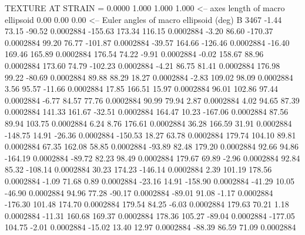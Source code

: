TEXTURE AT STRAIN =    0.0000
   1.000   1.000   1.000  <-- axes length of macro ellipsoid
    0.00    0.00    0.00  <-- Euler angles of macro ellipsoid (deg)
B      3467
       -1.44       73.15      -90.52     0.0002884
     -155.63      173.34      116.15     0.0002884
       -3.20       86.60     -170.37     0.0002884
       99.20       76.77     -101.87     0.0002884
      -39.57      164.66     -126.46     0.0002884
      -16.40      169.46      165.89     0.0002884
      176.54       74.22       -9.91     0.0002884
       -0.02      158.67       88.96     0.0002884
      173.60       74.79     -102.23     0.0002884
       -4.21       86.75       81.41     0.0002884
      176.98       99.22      -80.69     0.0002884
       89.88       88.29       18.27     0.0002884
       -2.83      109.02       98.09     0.0002884
        3.56       95.57      -11.66     0.0002884
       17.85      166.51       15.97     0.0002884
       96.01      102.86       97.44     0.0002884
       -6.77       84.57       77.76     0.0002884
       90.99       79.94        2.87     0.0002884
        4.02       94.65       87.39     0.0002884
      141.33      161.67      -32.51     0.0002884
      164.47       10.23     -167.06     0.0002884
       87.56       89.94      103.75     0.0002884
        6.24        8.76      176.61     0.0002884
       36.28      166.59       31.91     0.0002884
     -148.75       14.91      -26.36     0.0002884
     -150.53       18.27       63.78     0.0002884
      179.74      104.10       89.81     0.0002884
       67.35      162.08       58.85     0.0002884
      -93.89       82.48      179.20     0.0002884
       92.66       94.86     -164.19     0.0002884
      -89.72       82.23       98.49     0.0002884
      179.67       69.89       -2.96     0.0002884
       92.84       85.32     -108.14     0.0002884
       30.23      174.23     -146.14     0.0002884
        2.39      101.19      178.56     0.0002884
       -1.09       71.68        0.89     0.0002884
      -23.16       14.91     -158.90     0.0002884
      -41.29       10.05      -46.90     0.0002884
       94.96       77.28      -90.17     0.0002884
      -89.01       91.08       -1.17     0.0002884
     -176.30      101.48      174.70     0.0002884
      179.54       84.25       -6.03     0.0002884
      179.63       70.21        1.18     0.0002884
      -11.31      160.68      169.37     0.0002884
      178.36      105.27      -89.04     0.0002884
     -177.05      104.75       -2.01     0.0002884
      -15.02       13.40       12.97     0.0002884
      -88.39       86.59       71.09     0.0002884
